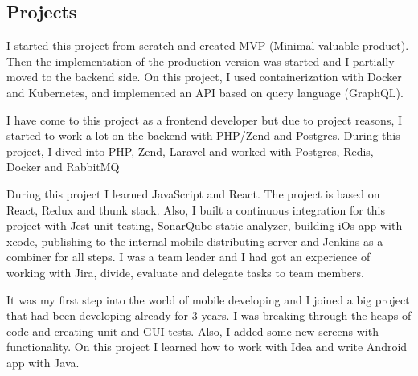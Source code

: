 \documentclass[11pt,a4paper,sans]{moderncv} %
\begin{document}
\subsection{Projects}


{I started this project from scratch and created MVP (Minimal valuable product). Then the implementation of the production version was started and I partially moved to the backend side. On this project, I used containerization with Docker and Kubernetes, and implemented an API based on query language (GraphQL). }

{I have come to this project as a frontend developer but due to project reasons, I started to work a lot on the backend with PHP/Zend and Postgres. During this project, I dived into PHP, Zend, Laravel and worked with Postgres, Redis, Docker and RabbitMQ}

{During this project I learned JavaScript and React. The project is based on React, Redux and thunk stack. Also, I built a continuous integration for this project with Jest unit testing, SonarQube static analyzer, building iOs app with xcode, publishing to the internal mobile distributing server and Jenkins as a combiner for all steps. I was a team leader and I had got an experience of working with Jira, divide, evaluate and delegate tasks to team members.}

{It was my first step into the world of mobile developing and I joined a big project that had been developing already for 3 years. I was breaking through the heaps of code and creating unit and GUI tests. Also, I added some new screens with functionality. On this project I learned how to work with Idea and write Android app with Java.}


\end{document}
